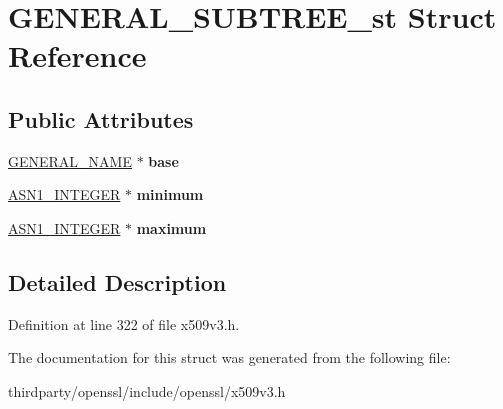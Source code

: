 \hypertarget{struct_g_e_n_e_r_a_l___s_u_b_t_r_e_e__st}{}\section{G\+E\+N\+E\+R\+A\+L\+\_\+\+S\+U\+B\+T\+R\+E\+E\+\_\+st Struct Reference}
\label{struct_g_e_n_e_r_a_l___s_u_b_t_r_e_e__st}
\subsection*{Public Attributes}
\begin{DoxyCompactItemize}
\item 
\mbox{\label{struct_g_e_n_e_r_a_l___s_u_b_t_r_e_e__st_a377ac586fdda36e7ec625fd30dce46f2}} 
\hyperlink{struct_g_e_n_e_r_a_l___n_a_m_e__st}{G\+E\+N\+E\+R\+A\+L\+\_\+\+N\+A\+ME} $\ast$ {\bfseries base}
\item 
\mbox{\label{struct_g_e_n_e_r_a_l___s_u_b_t_r_e_e__st_a57dba1d7a481583e1564730497dcb672}} 
\hyperlink{structasn1__string__st}{A\+S\+N1\+\_\+\+I\+N\+T\+E\+G\+ER} $\ast$ {\bfseries minimum}
\item 
\mbox{\label{struct_g_e_n_e_r_a_l___s_u_b_t_r_e_e__st_a19f63f3012ce4f64c219de133c9ff488}} 
\hyperlink{structasn1__string__st}{A\+S\+N1\+\_\+\+I\+N\+T\+E\+G\+ER} $\ast$ {\bfseries maximum}
\end{DoxyCompactItemize}


\subsection{Detailed Description}


Definition at line 322 of file x509v3.\+h.



The documentation for this struct was generated from the following file\+:\begin{DoxyCompactItemize}
\item 
thirdparty/openssl/include/openssl/x509v3.\+h\end{DoxyCompactItemize}
